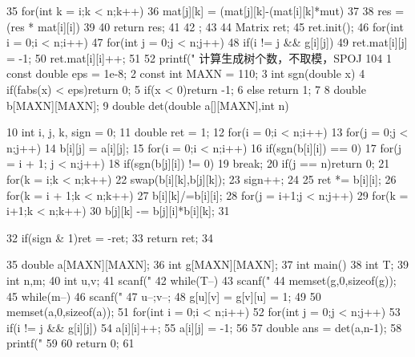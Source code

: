 \documentclass[11pt]{article}
\begin{document}
\begin{Code}
{{{{35                     for(int k = i;k < n;k++)
36                         mat[j][k] = (mat[j][k]-(mat[i][k]*mut)%
37                  }
38                  res = (res * mat[i][i])%
39              }
40              return res;
41       }
42 };
43
44              Matrix ret;
45              ret.init();
46              for(int i = 0;i < n;i++)
47                  for(int j = 0;j < n;j++)
48                      if(i != j && g[i][j]){
49                          ret.mat[i][j] = -1;
50                          ret.mat[i][i]++;
51                      }
52              printf("%
     计算生成树个数，不取模，SPOJ 104
 1   const double eps = 1e-8;
 2   const int MAXN = 110;
 3   int sgn(double x){
 4       if(fabs(x) < eps)return 0;
 5       if(x < 0)return -1;
 6       else return 1;
 7   }
 8   double b[MAXN][MAXN];
 9   double det(double a[][MAXN],int n){
10       int i, j, k, sign = 0;
11       double ret = 1;
12       for(i = 0;i < n;i++)
13           for(j = 0;j < n;j++)
14               b[i][j] = a[i][j];
15       for(i = 0;i < n;i++){
16           if(sgn(b[i][i]) == 0){
17               for(j = i + 1; j < n;j++)
18                   if(sgn(b[j][i]) != 0)
19                       break;
20               if(j == n)return 0;
21               for(k = i;k < n;k++)
22                   swap(b[i][k],b[j][k]);
23               sign++;
24           }
25           ret *= b[i][i];
26           for(k = i + 1;k < n;k++)
27               b[i][k]/=b[i][i];
28           for(j = i+1;j < n;j++)
29               for(k = i+1;k < n;k++)
30                   b[j][k] -= b[j][i]*b[i][k];
31       }


32       if(sign & 1)ret = -ret;
33       return ret;
34   }
35   double a[MAXN][MAXN];
36   int g[MAXN][MAXN];
37   int main(){
38       int T;
39       int n,m;
40       int u,v;
41       scanf("%
42       while(T--){
43           scanf("%
44           memset(g,0,sizeof(g));
45           while(m--){
46                scanf("%
47                u--;v--;
48                g[u][v] = g[v][u] = 1;
49           }
50           memset(a,0,sizeof(a));
51           for(int i = 0;i < n;i++)
52                for(int j = 0;j < n;j++)
53                    if(i != j && g[i][j]){
54                        a[i][i]++;
55                        a[i][j] = -1;
56                    }
57           double ans = det(a,n-1);
58           printf("%
59       }
60       return 0;
61   }
\end{Code}
\end{document}
